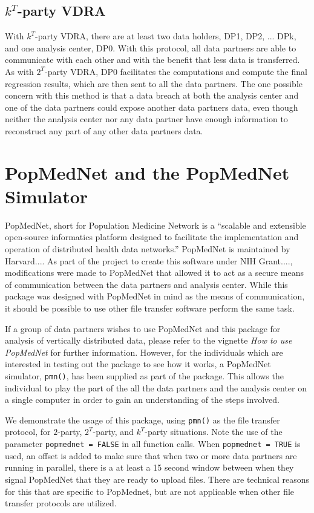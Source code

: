 \documentclass[12]{article}
\begin{document}
\subsection{$k^T$-party VDRA}

With $k^T$-party VDRA, there are at least two data holders, DP1, DP2, ... DPk, and one analysis center, DP0.  With this protocol, all data partners are able to communicate with each other and with the benefit that less data is transferred.  As with $2^T$-party VDRA, DP0 facilitates the computations and compute the final regression results, which are then sent to all the data partners.  The one possible concern with this method is that a data breach at both the analysis center and one of the data partners could expose another data partners data, even though neither the analysis center nor any data partner have enough information to reconstruct any part of any other data partners data.

\section{PopMedNet and the PopMedNet Simulator}

PopMedNet, short for Population Medicine Network is a ``scalable and extensible open-source informatics platform designed to facilitate the implementation and operation of distributed health data networks.''  PopMedNet is maintained by Harvard....  As part of the project to create this software under NIH Grant...., modifications were made to PopMedNet that allowed it to act as a secure means of communication between the data partners and analysis center.  While this package was designed with PopMedNet in mind as the means of communication, it should be possible to use other file transfer software perform the same task.

If a group of data partners wishes to use PopMedNet and this package for analysis of vertically distributed data, please refer to the vignette \emph{How to use PopMedNet} for further information.  However, for the individuals which are interested in testing out the package to see how it works, a PopMedNet simulator, \verb"pmn()", has been supplied as part of the package.  This allows the individual to play the part of the all the data partners and the analysis center on a single computer in order to gain an understanding of the steps involved.

We demonstrate the usage of this package, using \verb"pmn()" as the file transfer protocol, for $2$-party, $2^T$-party, and $k^T$-party situations.  Note the use of the parameter \verb"popmednet = FALSE" in all function calls.  When \verb"popmednet = TRUE" is used, an offset is added to make sure that when two or more data partners are running in parallel, there is a at least a 15 second window between when they signal PopMedNet that they are ready to upload files.  There are technical reasons for this that are specific to PopMednet, but are not applicable when other file transfer protocols are utilized.
\end{document}
